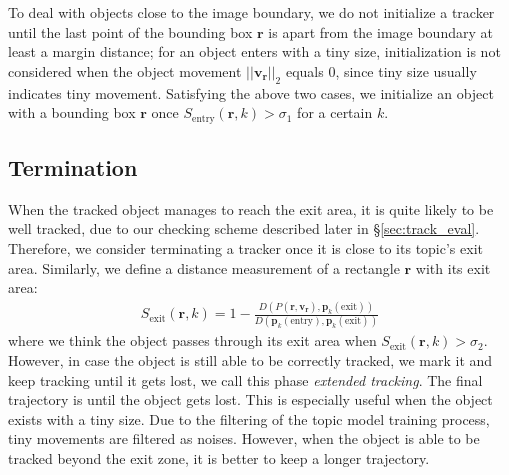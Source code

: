     To deal with objects close to the image boundary, we do not initialize a tracker until the last point of the bounding box $\bm{r}$ is apart from the image boundary at least a margin distance; for an object enters with a tiny size, initialization is not considered when the object movement $||\bm{v_r}||_2$ equals $0$, since tiny size usually indicates tiny movement.
    Satisfying the above two cases, we initialize an object with a bounding box $\bm{r}$ once $S_{\text{entry}}(\bm{r}, k) > \sigma_{1}$ for a certain $k$. 

\subsection{Termination}
    When the tracked object manages to reach the exit area, it is quite likely to be well tracked, due to our checking scheme described later in \S\ref{sec:track_eval}. Therefore, we consider terminating a tracker once it is close to its topic's exit area. 
    Similarly, we define a distance measurement of a rectangle $\bm{r}$ with its exit area:
    \begin{align}
        S_\text{exit}(\bm{r}, k) = 1-\frac{D\left(P(\bm{r}, \bm{v_r}), \bm{p}_k(\text{exit})\right)}{D\left(\bm{p}_k(\text{entry}), \bm{p}_k(\text{exit})\right)}
    \end{align}
    where we think the object passes through its exit area when $S_\text{exit}(\bm{r}, k) > \sigma_2$.
    However, in case the object is still able to be correctly tracked, we mark it and keep tracking until it gets lost, we call this phase \emph{extended tracking}. 
    The final trajectory is until the object gets lost. This is especially useful when the object exists with a tiny size. Due to the filtering of the topic model training process, tiny movements are filtered as noises. However, when the object is able to be tracked beyond the exit zone, it is better to keep a longer trajectory. 

